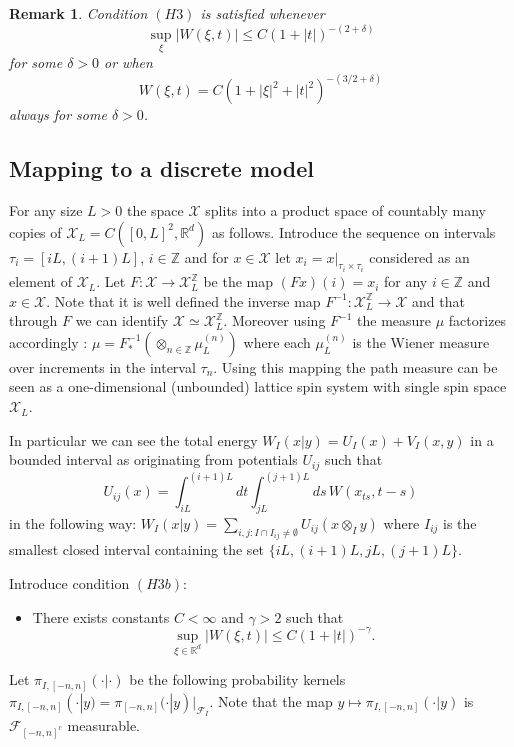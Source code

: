 \documentclass[a4paper,12pt,reqno]{amsart}
\newtheorem{remark}[theorem]{Remark}
\newcommand{\R}{\mathbb{R}}
\newcommand{\Z}{\mathbb{Z}}
\newcommand{\X}{\mathcal{X}}
\newcommand{\F}{\mathcal{F}}
\begin{document}
\begin{remark}
Condition $(H3)$ is satisfied whenever
$$
\sup_{\xi} |W(\xi,t)| \le C (1+|t|)^{-(2+\delta)}
$$
for some $\delta > 0$ or when
$$
W(\xi,t) = C (1+|\xi|^2+|t|^2)^{-(3/2+\delta)}
$$  
always for some $\delta > 0$.
\end{remark}


\subsection{Mapping to a discrete model}
For any size $L > 0$ the space $\X$ splits into a product space of
countably many copies of $\X_L = C([0,L]^2,\R^d)$ as follows.
Introduce the sequence on intervals $\tau_i = [iL,(i+1)L]$, $i \in
\mathbb{Z}$ and for $x \in \X$ let $x_i = x|_{\tau_i \times \tau_i}$
considered as an element of $\X_L$. Let $F : \X \to \X_L^{\Z}$ be the
map $(F x)(i) = x_i$ for any $i \in \Z$ and $x \in \X$. Note that it
is well defined the inverse map $F^{-1} : \X_L^{\mathbb{Z}} \to \X$
and that through $F$ we can identify $\X \simeq \X_L^{\Z}$. Moreover
using $F^{-1}$ the measure $\mu$ factorizes accordingly : $\mu =
F^{-1}_* (\otimes_{n \in \Z} \mu_L^{(n)})$ where each $\mu^{(n)}_L$ is
the Wiener measure over increments in the interval $\tau_n$. Using
this mapping the path measure can be seen as a one-dimensional
(unbounded) lattice spin system with single spin space $\X_L$. 

In particular we can see the total energy $W_I(x|y) = U_I(x) + V_I(x,y)$ in a bounded interval
as originating from potentials $U_{ij}$ such that
$$
U_{ij}(x) = \int_{iL}^{(i+1)L} dt \int_{jL}^{(j+1)L} ds\, W(x_{ts},t-s)
$$
in the following way:
$
W_I(x|y) =\sum_{i,j : I \cap I_{ij} \neq \emptyset} U_{ij}(x \otimes_I y)
$
where $I_{ij}$ is the smallest closed interval containing the set
$\{iL,(i+1)L,jL,(j+1)L\}$. 

Introduce condition $(H3b)$:
\begin{itemize}
\item[\textbf{(H3b)}] There exists  constants $C<\infty$ and $\gamma > 2$ such that
$$
\sup_{\xi\in \R^d}|W(\xi,t)| \le C (1+|t|)^{-\gamma}.
$$
\end{itemize}


Let $\pi_{I,[-n,n]}(\cdot|\cdot)$ be the following probability kernels
$
\pi_{I,[-n,n]}(\cdot|y) = \pi_{[-n,n]}(\cdot|y)|_{\F_I}
$.
Note that the map $y \mapsto \pi_{I,[-n,n]}(\cdot|y)$ is
$\F_{[-n,n]^c}$ measurable.
\end{document}
